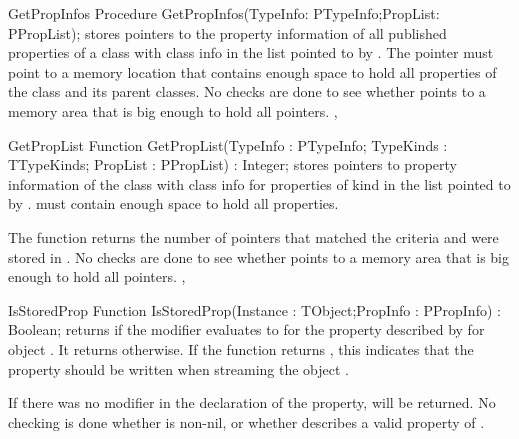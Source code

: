 \begin{procedure}{GetPropInfos}
\Declaration
Procedure GetPropInfos(TypeInfo: PTypeInfo;PropList: PPropList);
\Description
{} stores pointers to the property information of all published
properties of a class with class info  in the list pointed to by
. The  pointer must point to a memory location that
contains enough space to hold all properties of the class and its parent classes.
\Errors
No checks are done to see whether  points to a memory area that 
is big enough to hold all pointers.
\SeeAlso
{},
\end{procedure}


\begin{function}{GetPropList}
\Declaration
Function GetPropList(TypeInfo : PTypeInfo;
                     TypeKinds : TTypeKinds; 
                     PropList : PPropList) : Integer;
\Description
{} stores pointers to property information of the class with class
info  for properties of kind  in the list pointed to
by .  must contain enough space to hold all properties.

The function returns the number of pointers that matched the criteria and were stored
in .
\Errors
No checks are done to see whether  points to a memory area that is big enough
to hold all pointers.
\SeeAlso
{}, 
\end{function}


\begin{function}{IsStoredProp}
\Declaration
Function IsStoredProp(Instance : TObject;PropInfo : PPropInfo) : Boolean;
\Description
{} returns  if the  modifier evaluates
to  for the property described by  for object 
. It returns  otherwise. If the function returns
, this indicates that the property should be written when
streaming the object .

If there was no  modifier in the declaration of the property, 
 will be returned. 
\Errors
No checking is done whether  is non-nil, or whether
 describes a valid property of .
\SeeAlso
\end{function}


